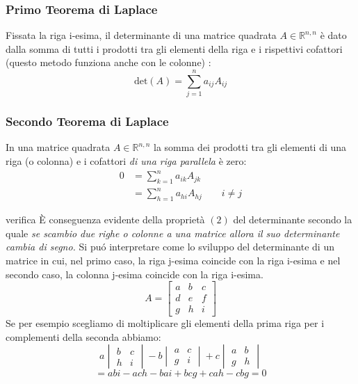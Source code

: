 \documentclass[x11names]{article}
\begin{document}
\subsubsection{Primo Teorema di Laplace}
Fissata la riga i-esima, il determinante di una matrice quadrata $A \in \mathbb{R}^{n,n}$ è dato dalla somma di tutti i prodotti tra gli elementi della riga e i rispettivi cofattori (questo metodo funziona anche con le colonne) :
$$
\text{det}(A) = \sum_{j=1}^{n}a_{ij}A_{ij}
$$
\subsubsection{Secondo Teorema di Laplace}
In una matrice quadrata $A \in \mathbb{R}^{n,n}$ la somma dei prodotti tra gli elementi di una riga (o colonna) e i  cofattori \textit{di una riga parallela} è zero:
\begin{align*}
  0 &= \sum_{k=1}^{n}a_{ik}A_{jk}  \\
    &= \sum_{h=1}^{n}a_{hi}A_{hj} \qquad i \neq j
\end{align*}



\begin{es}{verifica}
    È conseguenza evidente della proprietà $(2)$ del determinante secondo la quale \textit{se scambio due righe o colonne a una matrice allora il suo determinante cambia di segno.} Si puó interpretare come lo sviluppo del determinante di un matrice in cui, nel primo caso, la riga j-esima coincide con la riga i-esima e nel secondo caso, la colonna j-esima coincide con la riga i-esima.
    $$
    A = \begin{bmatrix}
        a & b & c \\
        d & e & f \\
        g & h & i
    \end{bmatrix} 
    $$
    Se per esempio scegliamo di moltiplicare gli elementi della prima riga per i complementi della seconda abbiamo:
    $$
    a\begin{vmatrix}
        b & c \\
        h & i
    \end{vmatrix}
    -b\begin{vmatrix}
        a & c \\
        g & i
    \end{vmatrix}
    +c\begin{vmatrix}
        a & b \\
        g & h
    \end{vmatrix}
    $$
    $$
    = abi - ach - bai + bcg + cah - cbg = 0
    $$
\end{es}
\end{document}
